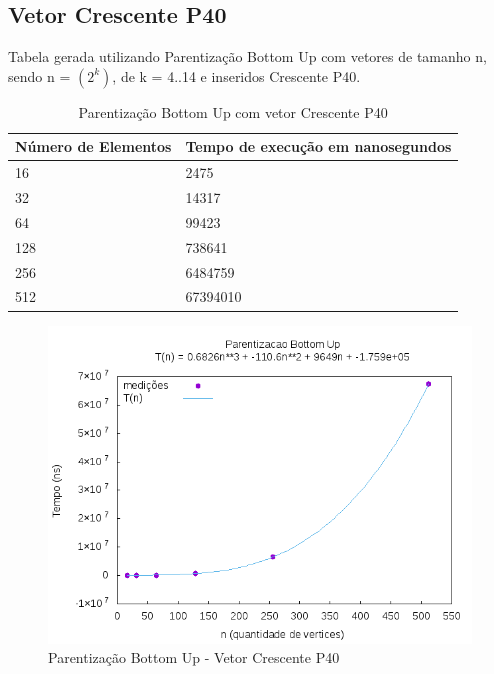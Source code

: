 \documentclass[12pt,a4paper,twoside]{report}
\begin{document}
\subsection{Vetor Crescente P40}
Tabela gerada utilizando Parentização Bottom Up com vetores de tamanho n, sendo n = $(2^k)$, de k = 4..14 e inseridos Crescente P40.
\begin{table}[H]
\centering
\caption{Parentização Bottom Up com vetor Crescente P40}
\label{my-label}
\begin{tabular}{|l|l|}
\hline
\multicolumn{1}{|c|}{\textbf{Número de Elementos}} & \multicolumn{1}{c|}{\textbf{Tempo de execução em nanosegundos}} \\ \hline
16 & 2475 \\ \hline
32 & 14317 \\ \hline
64 & 99423 \\ \hline
128 & 738641 \\ \hline
256 & 6484759 \\ \hline
512 & 67394010 \\ \hline

\end{tabular}
\end{table}

\begin{figure}[H]
    \centering
    \includegraphics[width=0.7\linewidth]{graficos/Parentizacao BottomUp/Crescente P40/ParentizacaoBottomUp.png}
  \caption{Parentização Bottom Up - Vetor Crescente P40}
\end{figure}
\end{document}
